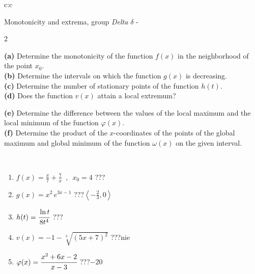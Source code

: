 \documentclass[10pt]{report}
\begin{document}
\begin{tabular}{c:c}
\begin{minipage}[c][104.5mm][t]{0.5\linewidth}
\begin{center}
\vspace{5mm}
{\huge Monotonicity and extrema, group \textit{Delta $\delta$} -}\\[5mm]
\begin{minipage}{0.95\linewidth}
\begin{center}
{\small \begin{multicols}{2} \raggedright
\textbf{(a)} Determine the monotonicity of the function \(f(x)\) in the neighborhood of the point \(x_0\). \\[1mm]
\textbf{(b)} Determine the intervals on which the function \(g(x)\) is decreasing. \\[1mm]
\textbf{(c)} Determine the number of stationary points of the function \(h(t)\). \\[1mm]
\textbf{(d)} Does the function \(v(x)\) attain a local extremum? \par \columnbreak
\textbf{(e)} Determine the difference between the values of the local maximum and the local minimum of the function \(\varphi(x)\). \\[1mm]
\textbf{(f)} Determine the product of the \(x\)-coordinates of the points of the global maximum and global minimum of the function \(\omega(x)\) on the given interval. \\[1mm]
\end{multicols}
}
\end{center}
\end{minipage}
\\[1mm]
\begin{minipage}{0.79\linewidth}
\begin{center}
\begin{varwidth}{\linewidth}
\setlength{\itemsep}{0pt}
\begin{enumerate}
\normalsize
\item $f(x)=\frac{x}{7}+\frac{7}{x} \enspace , \enspace x_0=4$\quad \dotfill\; ???\;\dotfill \quad {}
\item $g(x)=x^2\, e^{3x-1}$\quad \dotfill\; ???\;\dotfill \quad $\left\langle-\frac{2}{3} , 0\right\rangle$
\item $h(t)=\cfrac{\ln t}{8t^4}$\quad \dotfill\; ???\;\dotfill {}
\item $v(x)=-1-\sqrt[3]{(5x+7)^2}$\quad \dotfill\; ???\;\dotfill \quad $\text{nie}$
\item $\varphi(x)=\cfrac{x^2+6x-2}{x-3}$\quad \dotfill\; ???\;\dotfill \quad $-20$

\end{enumerate}
\end{varwidth}
\end{center}
\end{minipage}
\end{center}
\end{minipage}
\end{tabular}
\end{document}
